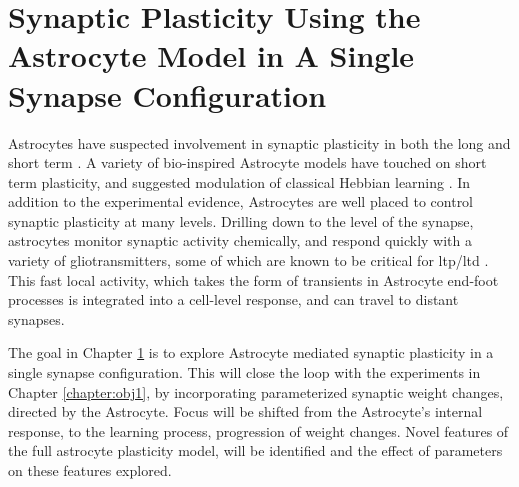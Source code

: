 \chapter{Synaptic Plasticity Using the Astrocyte Model in A Single Synapse
  Configuration} \label{chapter:obj2}

Astrocytes have suspected involvement in synaptic plasticity in both the
long \cite{min_2012} and short term \cite{pitta_2012}. A variety of
bio-inspired Astrocyte models have touched on short term plasticity, and
suggested modulation of classical Hebbian learning \cite{pitta_2016}. In
addition to the experimental evidence, Astrocytes are well placed to control
synaptic plasticity at many levels. Drilling down to the level of the
synapse, astrocytes monitor synaptic activity chemically, and respond
quickly with a variety of gliotransmitters, some of which are known to be
critical for \Gls{ltp}/\Gls{ltd} \cite{min_2012}. This fast local activity, which takes
the form of \ca transients in Astrocyte end-foot processes is integrated
into a cell-level response, and can travel to distant synapses.

The goal in Chapter \ref{chapter:obj2} is to explore Astrocyte mediated synaptic
plasticity in a single synapse configuration. This will close the loop with the
experiments in Chapter \ref{chapter:obj1}, by incorporating parameterized
synaptic weight changes, directed by the Astrocyte. Focus will be shifted from the
Astrocyte's internal response, to the learning process, progression of weight
changes. Novel features of the full astrocyte plasticity model, will be
identified and the effect of parameters on these features explored.


